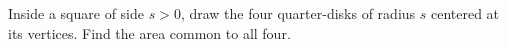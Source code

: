 Inside a square of side $s>0$, draw the four quarter-disks of radius $s$ centered at its vertices. Find the area common to all four.
